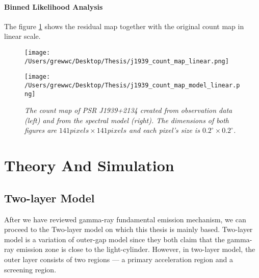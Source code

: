\documentclass[12pt]{report}
\newcommand{\mycaption}[1]{\caption{\textit{\footnotesize #1}}}
\begin{document}
      \subsubsection{Binned Likelihood Analysis}
          The figure \ref{fig: j1939_count_map_diff} shows the residual map together with the 
          original count map in linear scale.
          \begin{figure}[!ht]
            \begin{center}
            \begin{minipage}{0.45\textwidth}
              \begin{center} 
                \texttt{[image: /Users/grewwc/Desktop/Thesis/j1939\_count\_map\_linear.png]}
              \end{center}
            \end{minipage}
            \begin{minipage}{0.45\textwidth}
              \begin{center}
                \texttt{[image: /Users/grewwc/Desktop/Thesis/j1939\_count\_map\_model\_linear.png]}
              \end{center}
            \end{minipage}
          \end{center}
          \centering
          \begin{minipage}{\textwidth}
            \mycaption{The count map of PSR J1939+2134 created from observation 
            data (\textsf{left}) and from the spectral model (\textsf{right}). The dimensions
            of both figures are $141 pixels \times 141 pixels$ and each pixel's size is
            $0.2^{\circ}\times0.2^{\circ}$.}
            \label{fig: j1939_count_map_diff}
          \end{minipage}
        \end{figure}
        \vspace{1cm}

          
    \chapter{Theory And Simulation}
      \section{Two-layer Model}
      After we have reviewed gamma-ray fundamental emission mechanism, we can proceed to
      the Two-layer model on which this thesis is mainly based. Two-layer model is a 
      variation of outer-gap model since they both claim that the gamma-ray emission zone
      is close to the light-cylinder. However, in two-layer model, the outer layer 
      consists of two regions --- a primary acceleration region and a screening region. 
\end{document}
